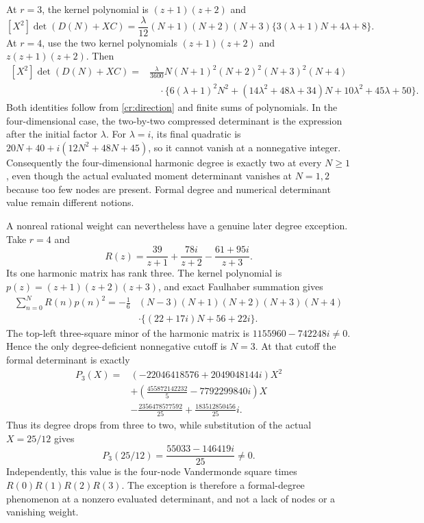 \documentclass[11pt,a4paper]{article}
\theoremstyle{definition}
\theoremstyle{remark}
\numberwithin{equation}{section}
\begin{document}
At $r=3$, the kernel polynomial is $(z+1)(z+2)$ and
\begin{equation}\label{cr:three}
 \boxed{
 [X^2]\det(D(N)+XC)=
 \frac{\lambda}{12}(N+1)(N+2)(N+3)
       \{3(\lambda+1)N+4\lambda+8\}.}
\end{equation}
At $r=4$, use the two kernel polynomials
$(z+1)(z+2)$ and $z(z+1)(z+2)$.  Then
\begin{equation}\label{cr:four}
 \begin{split}
 [X^2]\det(D(N)+XC)
 ={}&\frac{\lambda}{3600}N(N+1)^2(N+2)^2(N+3)^2(N+4)\\
 &\quad\cdot\bigl\{6(\lambda+1)^2N^2
 +(14\lambda^2+48\lambda+34)N
 +10\lambda^2+45\lambda+50\bigr\}.
 \end{split}
\end{equation}
Both identities follow from \eqref{cr:direction} and finite sums of
polynomials.  In the four-dimensional case, the two-by-two compressed
determinant is the expression after the initial factor $\lambda$.
For $\lambda=i$, its final quadratic is
$20N+40+i(12N^2+48N+45)$, so it cannot vanish at a nonnegative
integer.  Consequently the four-dimensional harmonic degree is
exactly two at every $N\ge1$, even though the actual evaluated
moment determinant vanishes at $N=1,2$ because too few nodes are
present.  Formal degree and numerical determinant value remain
different notions.

A nonreal rational weight can nevertheless have a genuine later
degree exception.  Take $r=4$ and
\begin{equation}\label{cr:exception-weight}
 R(z)=\frac{39}{z+1}+\frac{78i}{z+2}
                        -\frac{61+95i}{z+3}.
\end{equation}
Its one harmonic matrix has rank three.  The kernel polynomial is
$p(z)=(z+1)(z+2)(z+3)$, and exact Faulhaber summation gives
\begin{equation}\label{cr:exception-compression}
 \begin{split}
 \sum_{n=0}^N R(n)p(n)^2
  =-\frac16&(N-3)(N+1)(N+2)(N+3)(N+4)\\
           &\cdot\{(22+17i)N+56+22i\}.
 \end{split}
\end{equation}
The top-left three-square minor of the harmonic matrix is
$1155960-742248i\ne0$.  Hence the only degree-deficient
nonnegative cutoff is $N=3$.  At that cutoff the formal determinant
is exactly
\begin{equation}\label{cr:exception-polynomial}
 \begin{split}
 P_3(X)={}&(-22046418576+2049048144i)X^2\\
 &+\left(\frac{455872142232}{5}-7792299840i\right)X\\
 &-\frac{2356478577592}{25}
                         +\frac{183512850456}{25}i.
 \end{split}
\end{equation}
Thus its degree drops from three to two, while substitution of the
actual $X=25/12$ gives
\[
 P_3(25/12)=\frac{55033-146419i}{25}\ne0.
\]
Independently, this value is the four-node Vandermonde square times
$R(0)R(1)R(2)R(3)$.  The exception is therefore a formal-degree
phenomenon at a nonzero evaluated determinant, and not a lack of
nodes or a vanishing weight.
\end{document}
